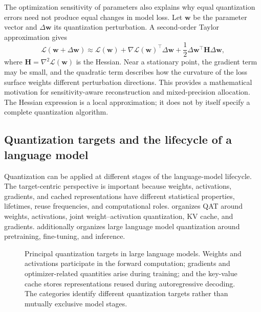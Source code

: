 The optimization sensitivity of parameters also explains why equal
quantization errors need not produce equal changes in model loss. Let
\(\mathbf{w}\) be the parameter vector and
\(\Delta\mathbf{w}\) its quantization perturbation. A second-order
Taylor approximation gives
\begin{equation}
    \mathcal{L}(\mathbf{w}+\Delta\mathbf{w})
    \approx
    \mathcal{L}(\mathbf{w})
    +
    \nabla\mathcal{L}(\mathbf{w})^{\top}\Delta\mathbf{w}
    +
    \frac{1}{2}
    \Delta\mathbf{w}^{\top}
    \mathbf{H}
    \Delta\mathbf{w},
    \label{eq:quant-loss-taylor}
\end{equation}
where \(\mathbf{H}=\nabla^2\mathcal{L}(\mathbf{w})\) is the Hessian.
Near a stationary point, the gradient term may be small, and the
quadratic term describes how the curvature of the loss surface weights
different perturbation directions. This provides a mathematical
motivation for sensitivity-aware reconstruction and mixed-precision
allocation. The Hessian expression is a local approximation; it does
not by itself specify a complete quantization algorithm.

\subsection{Quantization targets and the lifecycle of a language model}
\label{subsec:quant-targets-lifecycle}

Quantization can be applied at different stages of the language-model
lifecycle. The target-centric perspective is important because weights,
activations, gradients, and cached representations have different
statistical properties, lifetimes, reuse frequencies, and computational
roles. \textcite{song2026targetcentricqat} organizes QAT around weights,
activations, joint weight--activation quantization, KV cache, and
gradients. \textcite{chen2026llmquantization} additionally organizes
large language model quantization around pretraining, fine-tuning, and
inference.

\begin{figure}[htbp]
    \centering
    
    \caption{Principal quantization targets in large language models.
    Weights and activations participate in the forward computation;
    gradients and optimizer-related quantities arise during training;
    and the key-value cache stores representations reused during
    autoregressive decoding. The categories identify different
    quantization targets rather than mutually exclusive model stages.}
    \label{fig:quant-targets}
\end{figure}


